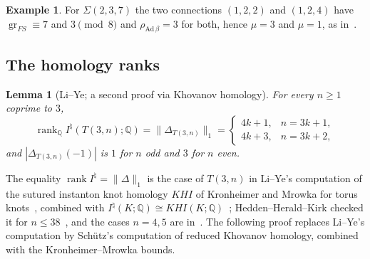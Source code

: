 \documentclass[11pt,reqno]{amsart}
\theoremstyle{plain}
\newtheorem{lemma}[theorem]{Lemma}
\theoremstyle{definition}
\newtheorem{example}[theorem]{Example}
\newcommand{\Inat}{I^{\natural}}
\newcommand{\gr}{\operatorname{gr}}
\newcommand{\Sig}{\Sigma}
\begin{document}
\begin{example}\label{ex:237}
For $\Sig(2,3,7)$ the two connections $(1,2,2)$ and $(1,2,4)$ have $\gr_{FS}\equiv7$ and $3\pmod8$ and
$\rho_{\mathrm{Ad}\,\beta}=3$ for both, hence $\mu=3$ and $\mu=1$, as in~\cite[Ex.~6.1]{Anvari}.
\end{example}

\subsection{The homology ranks}

\begin{lemma}[Li--Ye; a second proof via Khovanov homology]\label{lem:homrank}
For every $n\ge1$ coprime to $3$,
\[
\operatorname{rank}_{\mathbb Q}\Inat(T(3,n);\mathbb Q)=\|\Delta_{T(3,n)}\|_1=
\begin{cases}4k+1,&n=3k+1,\\ 4k+3,&n=3k+2,\end{cases}
\]
and $|\Delta_{T(3,n)}(-1)|$ is $1$ for $n$ odd and $3$ for $n$ even.
\end{lemma}

The equality $\operatorname{rank}\Inat=\|\Delta\|_1$ is the case of $T(3,n)$ in Li--Ye's computation of
the sutured instanton knot homology $KHI$ of Kronheimer and Mrowka for torus knots~\cite[Cor.~1.8]{LiYe},
combined with $\Inat(K;\mathbb Q)\cong KHI(K;\mathbb Q)$~\cite[Prop.~1.4]{KM2}; Hedden--Herald--Kirk checked it for $n\le38$~\cite[\S12.4]{HHK1},
and the cases $n=4,5$ are in~\cite[\S\S9.3--9.4]{DSEquiv}. The following proof replaces Li--Ye's
computation by Sch\"utz's computation of reduced Khovanov homology, combined with the
Kronheimer--Mrowka bounds.
\end{document}
